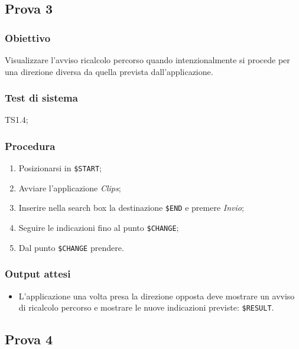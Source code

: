 \documentclass[../SperimentazioniPratiche.tex]{subfiles}
\begin{document}
	
	
\newpage
\subsection{Prova 3} %
\label{subsec:Prova3}
	
	\subsubsection{Obiettivo}
		Visualizzare l'avviso ricalcolo percorso quando intenzionalmente si procede per una direzione diversa da quella prevista dall'applicazione.
		
	\subsubsection{Test di sistema}
		TS1.4;
		
	\subsubsection{Procedura}
		\begin{enumerate}
		\item Posizionarsi in  \verb|$START|;
		\item Avviare l'applicazione \textit{Clips};
		\item Inserire nella search box la destinazione  \verb|$END| e premere \textit{Invio};
		\item Seguire le indicazioni fino al punto  \verb|$CHANGE|;
		\item Dal punto \verb|$CHANGE| prendere.
		\end{enumerate}
		
	\subsubsection{Output attesi}
		\begin{itemize}
		\item L'applicazione una volta presa la direzione opposta deve mostrare un avviso di ricalcolo percorso e mostrare le nuove indicazioni previste:  \verb|$RESULT|.
		\end{itemize}
		
	
	
\newpage		
\subsection{Prova 4} %
\label{subsec:Prova4}
	
\end{document}
